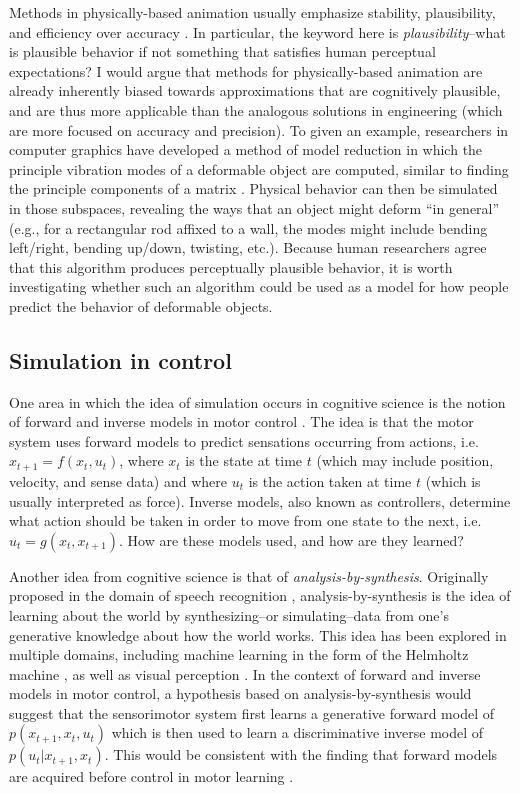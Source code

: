 \documentclass[12pt]{article}
\begin{document}
Methods in physically-based animation usually emphasize stability, plausibility, and efficiency over accuracy \citep{Witkin1997,Stam1999,Muller2002,Guendelman2003,Bridson2003,Muller2003}. In particular, the keyword here is \textit{plausibility}--what is plausible behavior if not something that satisfies human perceptual expectations? I would argue that methods for physically-based animation are already inherently biased towards approximations that are cognitively plausible, and are thus more applicable than the analogous solutions in engineering (which are more focused on accuracy and precision). To given an example, researchers in computer graphics have developed a method of model reduction in which the principle vibration modes of a deformable object are computed, similar to finding the principle components of a matrix \citep{Nealen2006}. Physical behavior can then be simulated in those subspaces, revealing the ways that an object might deform ``in general'' (e.g., for a rectangular rod affixed to a wall, the modes might include bending left/right, bending up/down, twisting, etc.). Because human researchers agree that this algorithm produces perceptually plausible behavior, it is worth investigating whether such an algorithm could be used as a model for how people predict the behavior of deformable objects.

\subsection*{Simulation in control}

One area in which the idea of simulation occurs in cognitive science is the notion of forward and inverse models in motor control \citep{Kawato1999,Flanagan2003}. The idea is that the motor system uses forward models to predict sensations occurring from actions, i.e. $x_{t+1}=f(x_t,u_t)$, where $x_t$ is the state at time $t$ (which may include position, velocity, and sense data) and where $u_t$ is the action taken at time $t$ (which is usually interpreted as force). Inverse models, also known as controllers, determine what action should be taken in order to move from one state to the next, i.e. $u_t=g(x_t,x_{t+1})$. How are these models used, and how are they learned?

Another idea from cognitive science is that of \textit{analysis-by-synthesis}. Originally proposed in the domain of speech recognition \citep{Halle1962,Halle1959}, analysis-by-synthesis is the idea of learning about the world by synthesizing--or simulating--data from one's generative knowledge about how the world works. This idea has been explored in multiple domains, including machine learning in the form of the Helmholtz machine \citep{Dayan1995}, as well as visual perception \citep{Yuille2006}. In the context of forward and inverse models in motor control, a hypothesis based on analysis-by-synthesis would suggest that the sensorimotor system first learns a generative forward model of $p(x_{t+1},x_t,u_t)$ which is then used to learn a discriminative inverse model of $p(u_t|x_{t+1},x_t)$. This would be consistent with the finding that forward models are acquired before control in motor learning \citep{Flanagan2003}.
\end{document}
